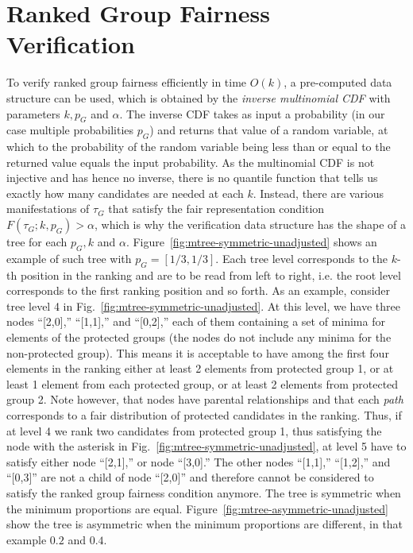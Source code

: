 
\section{Ranked Group Fairness Verification}
\label{sec:fairness-verification}

To verify ranked group fairness efficiently in time $O(k)$, a pre-computed data structure can be used, which is obtained by the \emph{inverse multinomial CDF} with parameters $k, p_G$ and $ \alpha $.
%
The inverse CDF takes as input a probability (in our case multiple probabilities $p_G$) and returns that value of a random variable, at which to the probability of the random variable being less than or equal to the returned value equals the input probability.
%
As the multinomial CDF is not injective and has hence no inverse, there is no quantile function that tells us exactly how many candidates are needed at each $ k $.
%
Instead, there are various manifestations of $ \tau_G $ that satisfy the fair representation condition $F(\tau_G;k,p_G) > \alpha$, which is why the verification data structure has the shape of a tree for each $ p_G, k $ and $ \alpha $.
%
Figure~\ref{fig:mtree-symmetric-unadjusted} shows an example of such tree with $p_G = [1/3, 1/3]$.
%
Each tree level corresponds to the $k$-th position in the ranking and are to be read from left to right, i.e. the root level corresponds to the first ranking position and so forth.
%
As an example, consider tree level 4 in Fig.~\ref{fig:mtree-symmetric-unadjusted}.
%
At this level, we have three nodes ``[2,0],'' ``[1,1],'' and ``[0,2],'' each of them containing a set of minima for elements of the protected groups (the nodes do not include any minima for the non-protected group).
%
This means it is acceptable to have among the first four elements in the ranking either at least 2 elements from protected group 1, or at least 1 element from each protected group, or at least 2 elements from protected group 2.
%
Note however, that nodes have parental relationships and that each \emph{path} corresponds to a fair distribution of protected candidates in the ranking.
%
Thus, if at level 4 we rank two candidates from protected group 1, thus satisfying the node with the asterisk in Fig.~\ref{fig:mtree-symmetric-unadjusted}, at level 5 have to satisfy either node ``[2,1],'' or node ``[3,0].''
%
The other nodes ``[1,1],'' ``[1,2],'' and ``[0,3]'' are not a child of node ``[2,0]'' and therefore cannot be considered to satisfy the ranked group fairness condition anymore.
%
The tree is symmetric when the minimum proportions are equal.
%
Figure~\ref{fig:mtree-asymmetric-unadjusted} show the tree is asymmetric when the minimum proportions are different, in that example $0.2$ and $0.4$.

